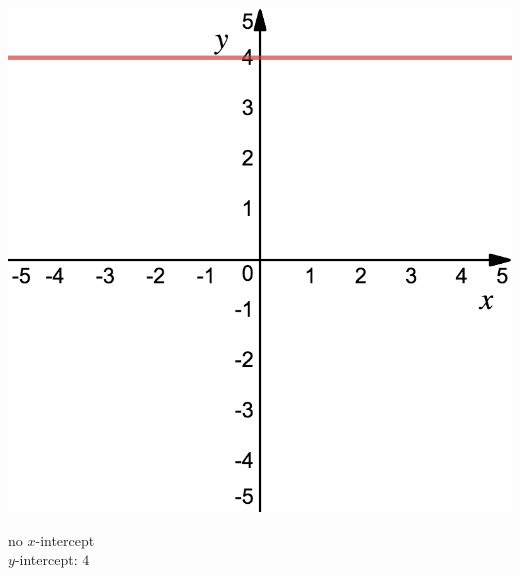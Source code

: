 \vspace{1cm}
\begin{minipage}{0.3\textwidth}%
\includegraphics[width=\linewidth]{pics/ex2.png}
\end{minipage}%
\hfill%
\begin{minipage}{0.6\textwidth}
no $x$-intercept \\
$y$-intercept: $4$
\end{minipage}


